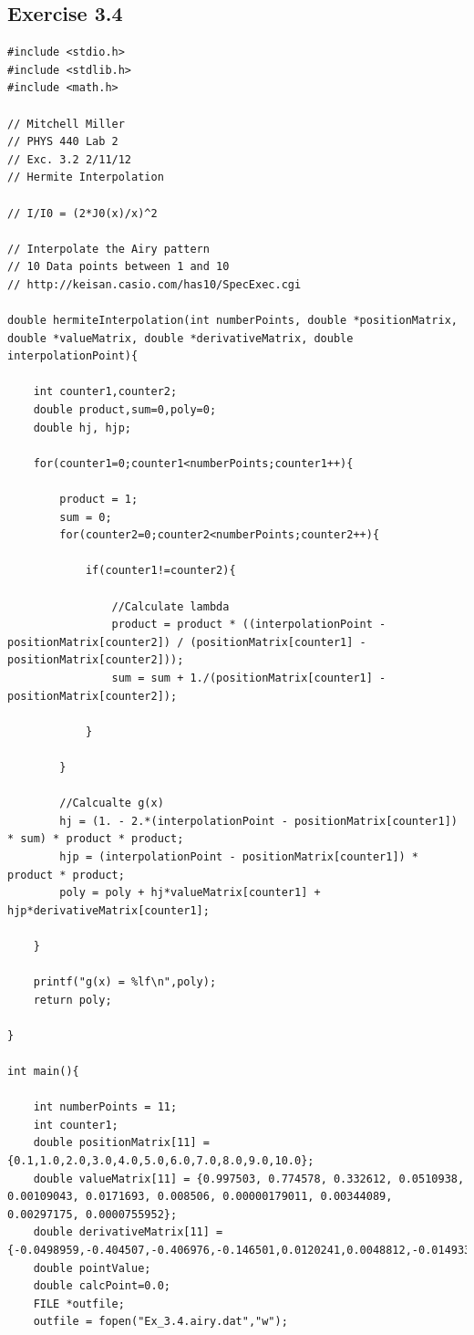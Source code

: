 \documentclass[12pt]{article}
\begin{document}
\subsection{Exercise 3.4}
\begin{verbatim}
#include <stdio.h>
#include <stdlib.h>
#include <math.h>

// Mitchell Miller
// PHYS 440 Lab 2
// Exc. 3.2 2/11/12
// Hermite Interpolation

// I/I0 = (2*J0(x)/x)^2

// Interpolate the Airy pattern
// 10 Data points between 1 and 10
// http://keisan.casio.com/has10/SpecExec.cgi

double hermiteInterpolation(int numberPoints, double *positionMatrix, double *valueMatrix, double *derivativeMatrix, double interpolationPoint){

	int counter1,counter2;
	double product,sum=0,poly=0;
	double hj, hjp;

	for(counter1=0;counter1<numberPoints;counter1++){

		product = 1;
		sum = 0;
		for(counter2=0;counter2<numberPoints;counter2++){

			if(counter1!=counter2){

				//Calculate lambda
				product = product * ((interpolationPoint - positionMatrix[counter2]) / (positionMatrix[counter1] - positionMatrix[counter2]));
				sum = sum + 1./(positionMatrix[counter1] - positionMatrix[counter2]);

			}
			
		}

		//Calcualte g(x)
		hj = (1. - 2.*(interpolationPoint - positionMatrix[counter1]) * sum) * product * product;
		hjp = (interpolationPoint - positionMatrix[counter1]) * product * product;
		poly = poly + hj*valueMatrix[counter1] + hjp*derivativeMatrix[counter1];

	}

	printf("g(x) = %lf\n",poly);
	return poly;

}

int main(){

	int numberPoints = 11;
	int counter1;
	double positionMatrix[11] = {0.1,1.0,2.0,3.0,4.0,5.0,6.0,7.0,8.0,9.0,10.0};
	double valueMatrix[11] = {0.997503, 0.774578, 0.332612, 0.0510938, 0.00109043, 0.0171693, 0.008506, 0.00000179011, 0.00344089, 0.00297175, 0.0000755952};
	double derivativeMatrix[11] = {-0.0498959,-0.404507,-0.406976,-0.146501,0.0120241,0.0048812,-0.0149331,-0.000230446,0.003314,-0.00350941,-0.000885558};
	double pointValue;
	double calcPoint=0.0;
	FILE *outfile;
	outfile = fopen("Ex_3.4.airy.dat","w");


\end{verbatim}
\end{document}
